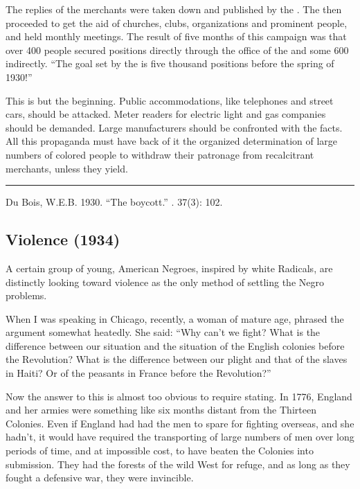 \documentclass[letterpaper,10pt,english]{jupyterBook}
\begin{document}
\sphinxAtStartPar
The replies of the merchants were taken down and published by the . The  then proceeded to get the aid of churches, clubs, organizations and prominent people, and held monthly meetings. The result of five months of this campaign was that over 400 people secured positions directly through the office of the  and some 600 indirectly. “The goal set by the  is five thousand positions before the spring of 1930!”

\sphinxAtStartPar
This is but the beginning. Public accommodations, like telephones and street cars, should be attacked. Meter readers for electric light and gas companies should be demanded. Large manufacturers should be confronted with the facts. All this propaganda must have back of it the organized determination of large numbers of colored people to withdraw their patronage from recalcitrant merchants, unless they yield.


\bigskip\hrule\bigskip


\sphinxAtStartPar
{} Du Bois, W.E.B. 1930. “The boycott.” . 37(3): 102.


\subsection{Violence (1934)}
\label{\detokenize{Volumes/41/05/violence:violence-1934}}\label{\detokenize{Volumes/41/05/violence::doc}}
\sphinxAtStartPar
A certain group of young, American Negroes, inspired by white Radicals, are distinctly looking toward violence as the only method of settling the Negro problems.

\sphinxAtStartPar
When I was speaking in Chicago, recently, a woman of mature age, phrased the argument somewhat heatedly. She said: “Why can’t we fight? What is the difference between our situation and the situation of the English colonies before the Revolution? What is the difference between our plight and that of the slaves in Haiti? Or of the peasants in France before the Revolution?”

\sphinxAtStartPar
Now the answer to this is almost too obvious to require stating. In 1776, England and her armies were something like six months distant from the Thirteen Colonies. Even if England had had the men to spare for fighting overseas, and she hadn’t, it would have required the transporting of large numbers of men over long periods of time, and at impossible cost, to have beaten the Colonies into submission. They had the forests of the wild West for refuge, and as long as they fought a defensive war, they were invincible.
\end{document}
